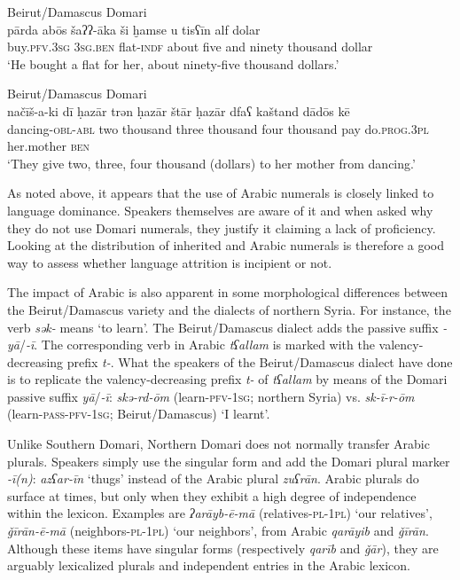 \documentclass[output=paper]{langsci/langscibook}
\begin{document}
\ea
{Beirut/Damascus Domari}\\ \label{parda}
\gll pārda abōs šaʔʔ-āka ši ḫamse u tisʕīn alf dolar\\
     buy.\textsc{pfv.3sg} \textsc{3sg.ben} flat\textsc{{}-indf} about five and ninety thousand dollar\\
\glt ‘He bought a flat for her, about ninety-five thousand dollars.’
\z

\ea \label{nacis}
{Beirut/Damascus Domari}\\
\gll načīš-a-ki dī ḥazār trən ḥazār štār ḥazār dfaʕ kaštand dādōs kē\\
     dancing-\textsc{obl-abl} two thousand three thousand four thousand pay do.\textsc{prog.3pl} her.mother \textsc{ben}\\
\glt ‘They give two, three, four thousand (dollars) to her mother from dancing.’
\z

As noted above, it appears that the use of Arabic numerals is closely linked to language dominance. Speakers themselves are aware of it and when asked why they do not use Domari numerals, they justify it claiming a lack of proficiency. Looking at the distribution of inherited and Arabic numerals is therefore a good way to assess whether language attrition is incipient or not.

The impact of Arabic is also apparent in some morphological differences between the Beirut/Damascus variety and the dialects of northern Syria. For instance, the verb \textit{sək-} means ‘to learn’. The Beirut/Damascus dialect adds the passive suffix \textit{-yā}/\textit{-ī}. The corresponding verb in Arabic \textit{tʕallam} is marked with the valency-decreasing prefix \textit{t-}. What the speakers of the Beirut/Damascus dialect have done is to replicate the valency-decreasing prefix \textit{t-} of \textit{tʕallam} by means of the Domari passive suffix  \textit{yā}/\textit{{}-ī}: \textit{skə-rd-ōm} (learn-\textsc{pfv-1sg}; northern Syria) vs. \textit{sk-ī-r-ōm} (learn-\textsc{pass-pfv-1sg}; Beirut/Damascus) ‘I learnt’.

Unlike Southern Domari, Northern Domari does not normally transfer Arabic plurals. Speakers simply use the singular form and add the Domari plural marker \textit{-ī(n)}:  \textit{azʕar-īn} ‘thugs’ instead of the Arabic plural \textit{zuʕrān}. Arabic plurals do surface at times, but only when they exhibit a high degree of independence within the lexicon. Examples are \textit{ʔarāyb-ē-mā} (relatives-\textsc{pl-1pl}) ‘our relatives’, \textit{\v{g}īrān-ē-mā} (neighbors-\textsc{pl-1pl}) ‘our neighbors’, from Arabic \textit{qarāyib} and \textit{\v{g}īrān}. Although these items have singular forms (respectively \textit{qarīb} and \textit{\v{g}ār}), they are arguably lexicalized plurals and independent entries in the Arabic lexicon.
\end{document}
